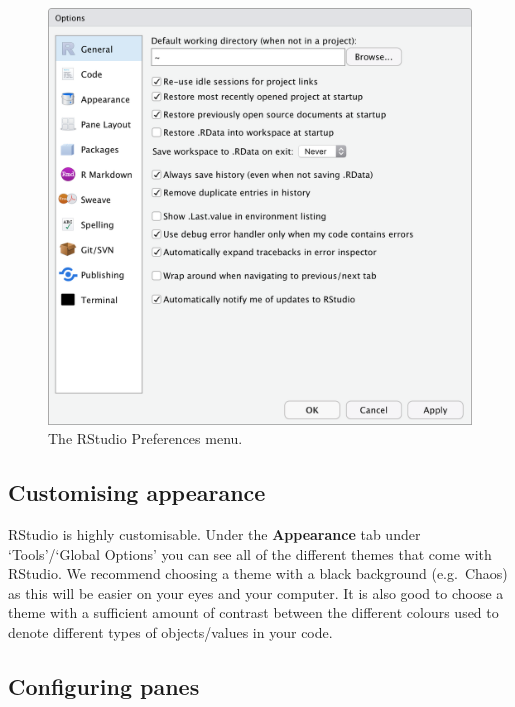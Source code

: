 \documentclass[]{book}
\theoremstyle{definition}
\theoremstyle{definition}
\theoremstyle{definition}
\theoremstyle{remark}
\begin{document}
\begin{figure}

{\centering \includegraphics[width=1\linewidth]{figures/RStudio_preferences} 

}

\caption{The RStudio Preferences menu.}\label{fig:RStudio-prefs}
\end{figure}

\subsection{Customising appearance}\label{customising-appearance}

RStudio is highly customisable. Under the \textbf{Appearance} tab under
`Tools'/`Global Options' you can see all of the different themes that
come with RStudio. We recommend choosing a theme with a black background
(e.g.~Chaos) as this will be easier on your eyes and your computer. It
is also good to choose a theme with a sufficient amount of contrast
between the different colours used to denote different types of
objects/values in your code.

\subsection{Configuring panes}\label{configuring-panes}
\end{document}
